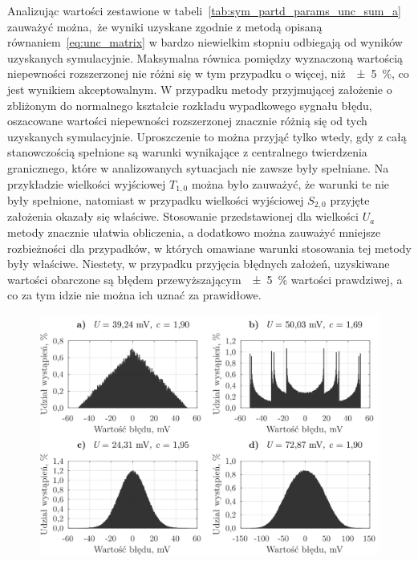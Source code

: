 Analizując wartości zestawione w tabeli~\ref{tab:sym_partd_params_unc_sum_a} zauważyć można, że wyniki uzyskane zgodnie z metodą opisaną równaniem~\eqref{eq:unc_matrix} w bardzo niewielkim stopniu odbiegają od wyników uzyskanych symulacyjnie. Maksymalna równica pomiędzy wyznaczoną wartością niepewności rozszerzonej nie różni się w tym przypadku o więcej, niż~\qty{\pm 5}{\percent}, co jest wynikiem akceptowalnym. W przypadku metody przyjmującej założenie o zbliżonym do normalnego kształcie rozkładu wypadkowego sygnału błędu, oszacowane wartości niepewności rozszerzonej znacznie różnią się od tych uzyskanych symulacyjnie. Uproszczenie to można przyjąć tylko wtedy, gdy z całą stanowczością spełnione są warunki wynikające z centralnego twierdzenia granicznego, które w analizowanych sytuacjach nie zawsze były spełniane. Na przykładzie wielkości wyjściowej $T_{1,0}$ można było zauważyć, że warunki te nie były spełnione, natomiast w przypadku wielkości wyjściowej $S_{2,0}$ przyjęte założenia okazały się właściwe. Stosowanie przedstawionej dla wielkości $U_{a}$ metody znacznie ułatwia obliczenia, a dodatkowo można zauważyć mniejsze rozbieżności dla przypadków, w których omawiane warunki stosowania tej metody były właściwe. Niestety, w przypadku przyjęcia błędnych założeń, uzyskiwane wartości obarczone są błędem przewyższającym~\qty{\pm 5}{\percent} wartości prawdziwej, a co za tym idzie nie można ich uznać za prawidłowe.

\begin{figure}[htb!]
\begin{center}
\includegraphics{obrazki/hist_part_S}
\end{center}
\end{figure}

